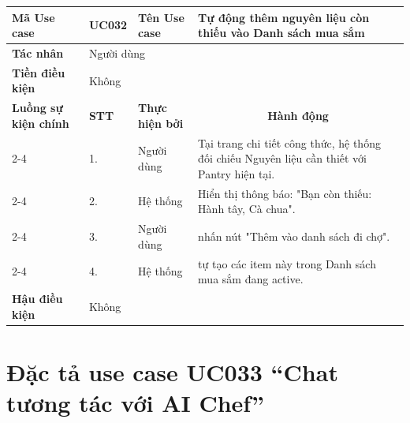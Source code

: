 \begin{longtable}{|p{2.7cm}|p{0.8cm}|p{2.6cm}|p{7.3cm}|}
\hline
\cellcolor[HTML]{D5F5E3}\textbf{Mã Use case} & \multicolumn{1}{l|}{UC032} & \cellcolor[HTML]{D5F5E3}\textbf{Tên Use case} & Tự động thêm nguyên liệu còn thiếu vào Danh sách mua sắm \\ \hline
\cellcolor[HTML]{D5F5E3}\textbf{Tác nhân} & \multicolumn{3}{p{10.7cm}|}{Người dùng} \\ \hline
\cellcolor[HTML]{D5F5E3}\textbf{Tiền điều kiện} & \multicolumn{3}{p{10.7cm}|}{Không} \\ \hline

\cellcolor[HTML]{D5F5E3}\textbf{Luồng sự kiện chính} & \cellcolor[HTML]{FDEBD0}\textbf{STT} & \cellcolor[HTML]{FDEBD0}\textbf{Thực hiện bởi} & \multicolumn{1}{c|}{\cellcolor[HTML]{FDEBD0}\textbf{Hành động}} \\ \cline{2-4} 
\cellcolor[HTML]{D5F5E3} & 1. & Người dùng & Tại trang chi tiết công thức, hệ thống đối chiếu Nguyên liệu cần thiết với Pantry hiện tại. \\ \cline{2-4} 
\cellcolor[HTML]{D5F5E3} & 2. & Hệ thống & Hiển thị thông báo: "Bạn còn thiếu: Hành tây, Cà chua". \\ \cline{2-4} 
\cellcolor[HTML]{D5F5E3} & 3. & Người dùng & nhấn nút "Thêm vào danh sách đi chợ". \\ \cline{2-4} 
\cellcolor[HTML]{D5F5E3} & 4. & Hệ thống & tự tạo các item này trong Danh sách mua sắm đang active. \\ \hline

\cellcolor[HTML]{D5F5E3}\textbf{Hậu điều kiện} & \multicolumn{3}{p{10.7cm}|}{Không} \\ \hline
\end{longtable}
\endgroup

\section{Đặc tả use case UC033 ``Chat tương tác với AI Chef''}
\vspace{0.5cm}

\begingroup
\renewcommand{\arraystretch}{1.5}

